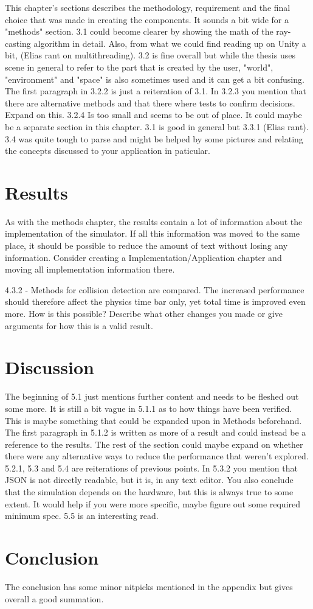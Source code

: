 \documentclass[12pt,a4paper,twoside,openright]{report}
\begin{document}
	This chapter's sections describes the methodology, requirement and the
	final choice that was made in creating the components. It sounds a bit wide
	for a "methods" section. 3.1 could become clearer by showing the math of
	the ray-casting algorithm in detail. Also, from what we could find reading
	up on Unity a bit, (Elias rant on multithreading). 3.2 is fine overall but
	while the thesis uses scene in general to refer to the part that is created
	by the user, "world", "environment" and "space" is also sometimes used and
	it can get a bit confusing. The first paragraph in 3.2.2 is just a
	reiteration of 3.1. In 3.2.3 you mention that there are alternative methods
	and that there where tests to confirm decisions. Expand on this. 3.2.4 Is
	too small and seems to be out of place. It could maybe be a separate
	section in this chapter. 3.1 is good in general but 3.3.1 (Elias rant). 3.4
	was quite tough to parse and might be helped by some pictures and relating
	the concepts discussed to your application in paticular.

\section*{Results}

	As with the methods chapter, the results contain a lot of information about
	the implementation of the simulator. If all this information was moved to
	the same place, it should be possible to reduce the amount of text without
	losing any information. Consider creating a Implementation/Application 
	chapter and moving all implementation information there.
	
	4.3.2 - Methods for collision detection are compared. The increased 
	performance should therefore affect the physics time bar only, yet total 
	time is improved even more. How is this possible? Describe what other 
	changes you made or give arguments for how this is a valid result.

\section*{Discussion}

	The beginning of 5.1 just mentions further content and needs to be fleshed 
	out	some more. It is still a bit vague in 5.1.1 as to how things have been
	verified. This is maybe something that could be expanded upon in Methods
	beforehand. The first paragraph in 5.1.2 is written as more of a result and
	could instead be a reference to the results. The rest of the section could
	maybe expand on whether there were any alternative ways to reduce the
	performance that weren't explored. 5.2.1, 5.3 and 5.4 are reiterations of
	previous points. In 5.3.2 you mention that JSON is not directly readable, 
	but it is, in any text editor. You also conclude that the simulation 
	depends on the hardware, but this is always true to some extent. It would 
	help if you were more specific, maybe figure out some required minimum 
	spec. 5.5 is an interesting read.

\section*{Conclusion}

	The conclusion has some minor nitpicks mentioned in the appendix but gives
	overall a good summation.
\end{document}

